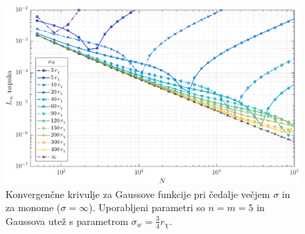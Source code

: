 \documentclass[12pt,a4paper,twoside]{article}
\theoremstyle{definition} %
\theoremstyle{plain} %
\numberwithin{equation}{section}
\newlength{\iw}
\begin{document}
\begin{figure}[h]
  \centering
  \includegraphics[width=\iw]{images/poisson_square_rbf_konv_k_mon.pdf}
  \caption[Konvergenčne krivulje za Gaussove funkcije.]{Konvergenčne krivulje
  za Gaussove funkcije pri čedalje večjem $\sigma$ in za monome ($\sigma =
  \infty$). Uporabljeni parametri so $n = m = 5$ in Gaussova utež s parametrom $\sigma_w =
  \frac34 r_\chi$.}
  \label{fig:rbf-konv-k-mon}
\end{figure}
\end{document}
